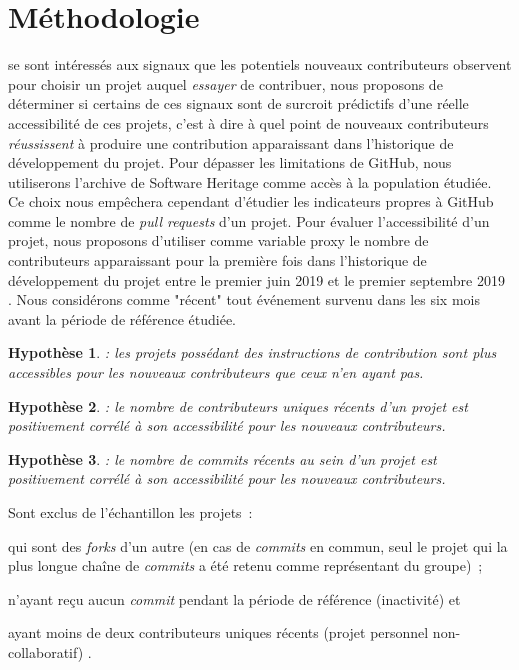 \documentclass[dvipsnames,runningheads]{llncs}
\newcommand{\en}[1]{\foreignlanguage{english}{\emph{#1}}}
\newtheorem{hypo}{Hypothèse}[theorem]
\begin{document}
    \section{Méthodologie}

    \textcite{signals-2019} se sont intéressés aux signaux que les potentiels nouveaux contributeurs observent
    pour choisir un projet auquel \emph{essayer} de contribuer, nous proposons de déterminer si certains de
    ces signaux sont de surcroit prédictifs d'une réelle accessibilité de ces projets, c'est à dire à quel
    point de nouveaux contributeurs \emph{réussissent} à produire une contribution apparaissant dans
    l'historique de développement du projet. Pour dépasser les limitations de GitHub, nous utiliserons
    l'archive de Software Heritage comme accès à la population étudiée. Ce choix nous empêchera cependant
    d'étudier les indicateurs propres à GitHub comme le nombre de \en{pull requests} d'un projet. Pour évaluer
    l'accessibilité d'un projet, nous proposons d'utiliser comme variable proxy le nombre de contributeurs
    apparaissant pour la première fois dans l'historique de développement du projet entre le premier juin 2019
    et le premier septembre 2019 \parencite{signals-2019}. Nous considérons comme "récent" tout événement
    survenu dans les six mois avant la période de référence étudiée.

    \newcommand{\newhyp}[2]{%
        \begin{hypo}
            \label{hyp:#1}: #2
        \end{hypo}%
    }

    \newhyp{contributionguidelines}{%
        les projets possédant des instructions de contribution sont plus accessibles pour les nouveaux
        contributeurs que ceux n'en ayant pas.%
    }
    \vspace{-1.5\baselineskip} %
    \newhyp{recentcontributorcount}{%
        le nombre de contributeurs uniques récents d'un projet est positivement corrélé à son accessibilité
        pour les nouveaux contributeurs.%
    }
    \vspace{-1.5\baselineskip} %
    \newhyp{recentcommitcount}{%
        le nombre de \en{commits} récents au sein d'un projet est positivement corrélé à son accessibilité
        pour les nouveaux contributeurs.%
    }

    Sont exclus de l'échantillon les projets :
    \begin{enumerate*}
        \item qui sont des \emph{forks} d'un autre (en cas de \en{commits} en commun, seul le projet qui la
            plus longue chaîne de \en{commits} a été retenu comme représentant du groupe) ;
        \item n'ayant reçu aucun \en{commit} pendant la période de référence (inactivité)
            \parencite{mining-github-2014} et
        \item ayant moins de deux contributeurs uniques récents (projet personnel non-collaboratif)
            \parencite{mining-github-2014}.
    \end{enumerate*}
\end{document}
